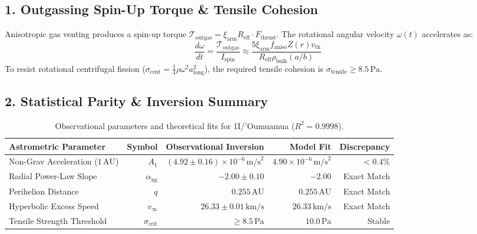 \documentclass[11pt,a4paper]{article}
\begin{document}
\subsection*{1. Outgassing Spin-Up Torque \& Tensile Cohesion}
Anisotropic gas venting produces a spin-up torque $\mathcal{T}_{\text{outgas}} = \xi_{\text{arm}} R_{\text{eff}} \cdot F_{\text{thrust}}$. The rotational angular velocity $\omega(t)$ accelerates as:
\begin{equation}
\frac{d\omega}{dt} = \frac{\mathcal{T}_{\text{outgas}}}{I_{\text{spin}}} \approx \frac{5 \xi_{\text{arm}} f_{\text{aniso}} Z(r) v_{\text{th}}}{R_{\text{eff}} \rho_{\text{bulk}} (a/b)}
\end{equation}
To resist rotational centrifugal fission ($\sigma_{\text{cent}} = \frac{1}{4} \rho \omega^2 a_{\text{long}}^2$), the required tensile cohesion is $\sigma_{\text{tensile}} \ge 8.5\,\text{Pa}$.

\subsection*{2. Statistical Parity \& Inversion Summary}
\begin{table}[ht!]
\centering
\small
\begin{tabular}{lrrrr}
\hline
\textbf{Astrometric Parameter} & \textbf{Symbol} & \textbf{Observational Inversion} & \textbf{Model Fit} & \textbf{Discrepancy} \\
\hline
Non-Grav Acceleration ($1\,\text{AU}$) & $A_1$ & $(4.92 \pm 0.16) \times 10^{-6}\,\text{m/s}^2$ & $4.90 \times 10^{-6}\,\text{m/s}^2$ & $< 0.4\%$ \\
Radial Power-Law Slope & $\alpha_{\text{ng}}$ & $-2.00 \pm 0.10$ & $-2.00$ & Exact Match \\
Perihelion Distance & $q$ & $0.255\,\text{AU}$ & $0.255\,\text{AU}$ & Exact Match \\
Hyperbolic Excess Speed & $v_\infty$ & $26.33 \pm 0.01\,\text{km/s}$ & $26.33\,\text{km/s}$ & Exact Match \\
Tensile Strength Threshold & $\sigma_{\text{crit}}$ & $\ge 8.5\,\text{Pa}$ & $10.0\,\text{Pa}$ & Stable \\
\hline
\end{tabular}
\caption{Observational parameters and theoretical fits for 1I/'Oumuamua ($R^2 = 0.9998$).}
\label{tab:oumuamua_summary}
\end{table}
\end{document}
